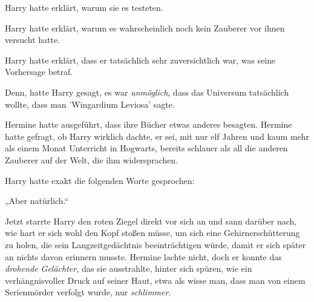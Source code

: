 Harry hatte erklärt, warum sie es testeten.

Harry hatte erklärt, warum es wahrscheinlich noch kein Zauberer vor ihnen versucht hatte.

Harry hatte erklärt, dass er tatsächlich sehr zuversichtlich war, was seine Vorhersage betraf.

Denn, hatte Harry gesagt, es war \emph{unmöglich}, dass das Universum tatsächlich wollte, dass man 'Wingardium Leviosa' sagte.

Hermine hatte ausgeführt, dass ihre Bücher etwas anderes besagten. Hermine hatte gefragt, ob Harry wirklich dachte, er sei, mit nur elf Jahren und kaum mehr als einem Monat Unterricht in Hogwarts, bereits schlauer als all die anderen Zauberer auf der Welt, die ihm widersprachen.

Harry hatte exakt die folgenden Worte gesprochen:

„Aber natürlich.“

Jetzt starrte Harry den roten Ziegel direkt vor sich an und sann darüber nach, wie hart er sich wohl den Kopf stoßen müsse, um sich eine Gehirnerschütterung zu holen, die sein Langzeitgedächtnis beeinträchtigen würde, damit er sich später an nichts davon erinnern musste. Hermine lachte nicht, doch er konnte das \emph{drohende Gelächter,} das sie ausstrahlte, hinter sich spüren, wie ein verhängnisvoller Druck auf seiner Haut, etwa als wisse man, dass man von einem Serienmörder verfolgt wurde, nur \emph{schlimmer}.

